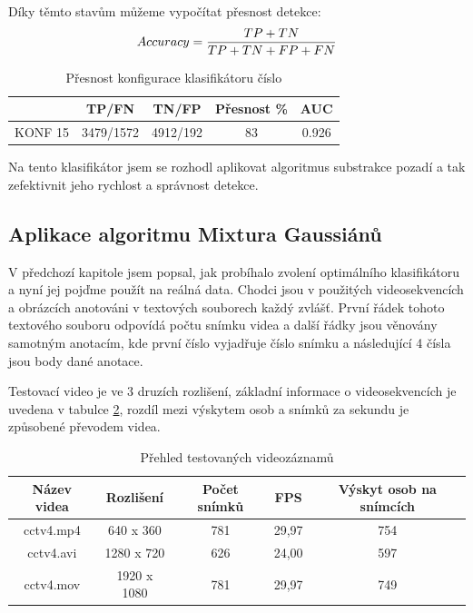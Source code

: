 Díky těmto stavům můžeme vypočítat přesnost detekce:
\begin{equation*}
\centering
 \label{eq:accuracy}
 \begin{aligned}
Accuracy = \frac{TP + TN}{TP + TN + FP + FN}
 \end{aligned}
\end{equation*}

\begin{table}[H]
\centering
\caption{Přesnost konfigurace klasifikátoru číslo}
\begin{tabular} { |c|c|c|c|c| }
\hline
{}          & {TP/FN} 	 & {TN/FP} 	& {Přesnost \%} & {AUC}  \\ \hline
KONF 15 	&  3479/1572 & 4912/192 &     83 		& 0.926  \\ \hline
\end{tabular}
\label{classTab2}
\end{table}
Na tento klasifikátor jsem se rozhodl aplikovat algoritmus substrakce pozadí a tak zefektivnit jeho rychlost a správnost detekce.

\subsection{Aplikace algoritmu Mixtura Gaussiánů}
V předchozí kapitole jsem popsal, jak probíhalo zvolení optimálního klasifikátoru a nyní jej pojďme použít na reálná data. Chodci jsou v použitých videosekvencích a obrázcích anotováni v textových souborech každý zvlášť. První řádek tohoto textového souboru odpovídá počtu snímku videa a další řádky jsou věnovány samotným anotacím, kde první číslo vyjadřuje číslo snímku a následující 4 čísla jsou body dané anotace.

Testovací video je ve 3 druzích rozlišení, základní informace o videosekvencích je uvedena v tabulce \ref{videosTab}, rozdíl mezi výskytem osob a snímků za sekundu je způsobené převodem videa.

\begin{table}[H]
\centering
\caption{Přehled testovaných videozáznamů}
\begin{tabular} { |c|c|c|c|c| }
\hline
{Název videa}   & {Rozlišení} 	& {Počet snímků}    & {FPS} & {Výskyt osob na snímcích}  	\\ \hline
cctv4.mp4 		&  640 x  360	& 781  				& 29,97	& 	754				\\ \hline
cctv4.avi		& 1280 x  720	& 626  				& 24,00	& 	597				\\ \hline
cctv4.mov 		& 1920 x 1080	& 781  				& 29,97	& 	749				\\ \hline
\end{tabular}
\label{videosTab}
\end{table}

